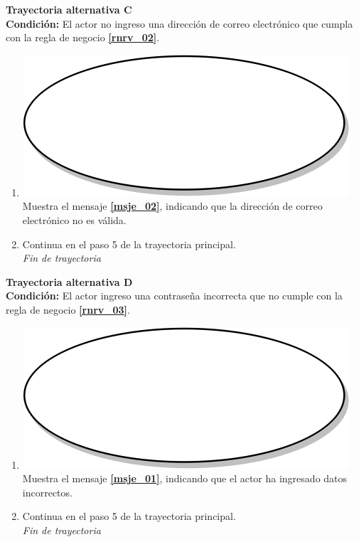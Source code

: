 \textbf{Trayectoria alternativa C} \label{cu2_ta_c}\\
\textbf{Condición:} El actor no ingreso una dirección de correo electrónico que cumpla con la regla de negocio \textbf{\ref{rnrv_02}}.\\
 \begin{enumerate}[label=C\arabic*]
    \item {\includegraphics[scale=.05]{Capitulo3/img/proceso.png} Muestra el mensaje \textbf{\ref{msje_02}}, indicando que la dirección de correo electrónico no es válida.}
    \item {Continua en el paso 5 de la trayectoria principal.} \\
    \textit{Fin de trayectoria} \\
\end{enumerate}

\textbf{Trayectoria alternativa D} \label{cu2_ta_d}\\
\textbf{Condición:} El actor ingreso una contraseña incorrecta que no cumple con la regla de negocio \textbf{\ref{rnrv_03}}.\\
 \begin{enumerate}[label=D\arabic*]
    \item {\includegraphics[scale=.05]{Capitulo3/img/proceso.png} Muestra el mensaje \textbf{\ref{msje_01}}, indicando que el actor ha ingresado datos incorrectos.}
    \item {Continua en el paso 5 de la trayectoria principal.} \\
    \textit{Fin de trayectoria} \\
\end{enumerate}

